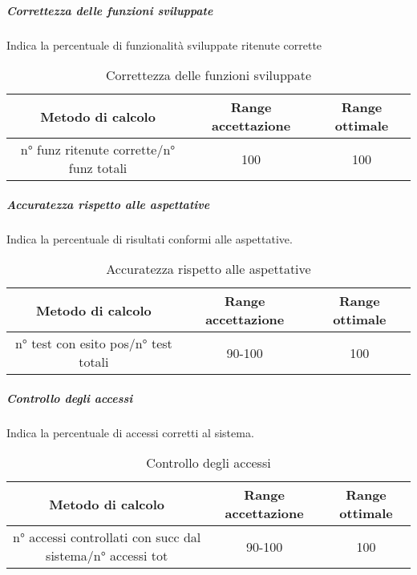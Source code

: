 			\subparagraph{Correttezza delle funzioni sviluppate}
			Indica la percentuale di funzionalità sviluppate ritenute corrette
			
			
			
				\begin{table}[H]
					\begin{center}
						\begin{tabular}{|c|c|c|}
							\hline
							\textbf{Metodo di calcolo} & \textbf{Range accettazione} & \textbf{Range ottimale} \\
							\hline
							n° funz ritenute corrette/n° funz totali & 100 & 100 \\
							\hline
						\end{tabular}
					\end{center}
					\caption{Correttezza delle funzioni sviluppate}
				\end{table}
			
			\subparagraph{Accuratezza rispetto alle aspettative}
			Indica la percentuale di risultati conformi alle aspettative.
				\begin{table}[H]
					\begin{center}
						\begin{tabular}{|c|c|c|}
							\hline
							\textbf{Metodo di calcolo} & \textbf{Range accettazione} & \textbf{Range ottimale} \\
							\hline
							n° test con esito pos/n° test totali & 90-100 & 100 \\
							\hline
						\end{tabular}
					\end{center}
					\caption{Accuratezza rispetto alle aspettative}
				\end{table}
			
			\subparagraph{Controllo degli accessi}
			Indica la percentuale di accessi corretti al sistema.
			\begin{table}[H]
				\begin{center}
					\begin{tabular}{|c|c|c|}
						\hline
						\textbf{Metodo di calcolo} & \textbf{Range accettazione} & \textbf{Range ottimale} \\
						\hline
						n° accessi controllati con succ dal sistema/n° accessi tot & 90-100 & 100 \\
						\hline
					\end{tabular}
				\end{center}
				\caption{Controllo degli accessi}
			\end{table}
	
